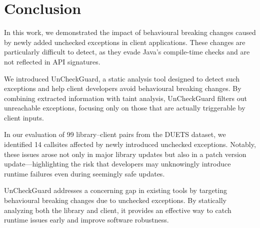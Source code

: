 \chapter{Conclusion}
In this work, we demonstrated the impact of behavioural breaking changes caused by newly added unchecked exceptions in client applications. These changes are particularly difficult to detect, as they evade Java's compile-time checks and are not reflected in API signatures.

We introduced UnCheckGuard, a static analysis tool designed to detect such exceptions and help client developers avoid behavioural breaking changes. By combining extracted information with taint analysis, UnCheckGuard filters out unreachable exceptions, focusing only on those that are actually triggerable by client inputs.

In our evaluation of 99 library–client pairs from the DUETS dataset, we identified 14 callsites affected by newly introduced unchecked exceptions. Notably, these issues arose not only in major library updates but also in a patch version update—highlighting the risk that developers may unknowingly introduce runtime failures even during seemingly safe updates.

UnCheckGuard addresses a concerning gap in existing tools by targeting behavioural breaking changes due to unchecked exceptions. By statically analyzing both the library and client, it provides an effective way to catch runtime issues early and improve software robustness.
